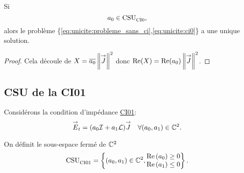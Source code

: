     \begin{prop}
      \label{prop:csu:ci0}
      Si
      \begin{equation*}
        a_0 \in \operatorname{CSU}_{\operatorname{CI0}}^{{}},
      \end{equation*}
      alors le problème \{\eqref{eq:unicite:probleme_sans_ci},\eqref{eq:unicite:ci0}\} a une unique solution.
    \end{prop}
    \begin{proof}
      Cela découle de \( X = {\overline{a_0}}\left\lVert{\overset{\rightarrow}{J}}\right\rVert^2\) donc \(\operatorname{Re}(X) = \operatorname{Re}(a_0)\left\lVert{\overset{\rightarrow}{J}}\right\rVert^2 \).
    \end{proof}
  \subsection{CSU de la CI01}
    Considérons la condition d’impédance \hyperlink{ci01}{CI01}:
    \begin{align}
      \label{eq:unicite:ci01}
      {\overset{\rightarrow}{E}}_t = (a_0{\mathcal{I}} + a_1 \mathcal{L}){\overset{\rightarrow}{J}} && \forall (a_0, a_1) \in \mathbb C^2.
    \end{align}

    \begin{defn}
      \label{def:csu:ci01}
      On définit le sous-espace fermé de \(\mathbb C^2\)
      \begin{equation*}
        \operatorname{CSU}_{\operatorname{CI01}}^{{}} = \left\lbrace (a_0,a_1) \in \mathbb C^2,
        \begin{matrix}
        \operatorname{Re}\left(a_0\right) \ge 0
        \\
        \operatorname{Re}\left(a_1\right) \le 0
        \end{matrix}
        \right\rbrace.
      \end{equation*}
    \end{defn}

